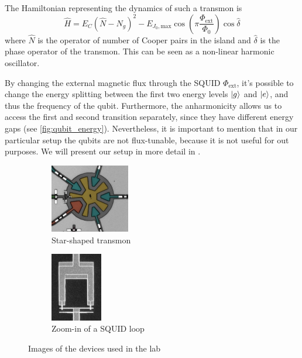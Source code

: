 \documentclass[12pt,a4paper]{report}
\begin{document}
The Hamiltonian representing the dynamics of such a transmon is 
\begin{equation}
    \hat{H} = E_C (\hat{N} - N_g)^2 - E_{J_0, \text{max}} \cos(\pi\frac{\Phi_{\text{ext}}}{\Phi_0})\cos\hat{\delta}
\end{equation}
where $\hat{N}$ is the operator of number of Cooper pairs in the island and $\hat{\delta}$ is the phase operator of the transmon.
This can be seen as a non-linear harmonic oscillator.

By changing the external magnetic flux through the SQUID $\Phi_\text{ext}$, it's possible to change the energy splitting between the first two energy levels $\ket{g}$ and $\ket{e}$, and thus the frequency of the qubit.
Furthermore, the anharmonicity allows us to access the first and second transition separately, since they have different energy gaps (see \cref{fig:qubit_energy}).
Nevertheless, it is important to mention that in our particular setup the qubits are not flux-tunable, because it is not useful for out purposes.
We will present our setup in more detail in .
\begin{figure}[t]
    \centering
    \begin{subfigure}[b]{0.45\linewidth}
      \centering
      \includegraphics[height=3cm]{Images/Chap1/star_transmon.png}
      \caption{Star-shaped transmon}
      \label{fig:stqr_transmon}
    \end{subfigure}
    \hfill
    \begin{subfigure}[b]{0.45\linewidth}
      \centering
      \includegraphics[height=3cm]{Images/Chap1/SQUID.jpeg}
      \caption{Zoom-in of a SQUID loop}
      \label{fig:squid_loop}
    \end{subfigure}
    \caption{Images of the devices used in the lab}
    \label{fig:transmon_squid_images}
  \end{figure}
\end{document}
